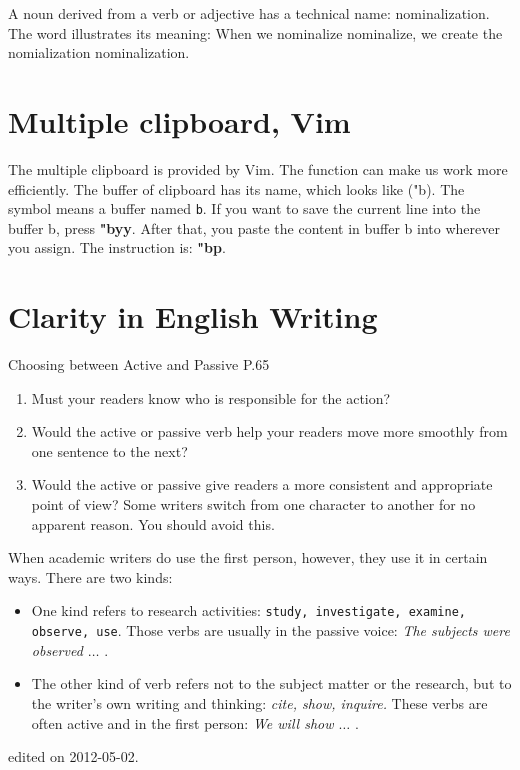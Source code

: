 A noun derived from a verb or adjective has a technical name: nominalization. The word illustrates its meaning: When we nominalize nominalize, we create the nomialization nominalization.

\section{Multiple clipboard, Vim}
The multiple clipboard is provided by Vim. The function can make us work more efficiently.  The buffer of clipboard has its name, which looks like ("b). The symbol means a buffer named \texttt{b}. If you want to save the current line into the buffer b, press {\bf "byy}. After that, you paste the content in buffer b into wherever you assign. The instruction is: {\bf"bp}. 

\section{Clarity in English Writing}
Choosing between Active and Passive P.65
\begin{enumerate}
\item Must your readers know who is responsible for the action?
\item Would the active or passive verb help your readers move more smoothly from one sentence to the next?
\item Would the active or passive give readers a more consistent and appropriate point of view?
Some writers switch from one character to another for no apparent reason. You should avoid this.
\end{enumerate}

When academic writers do use the first person, however, they use it in certain ways. There are two kinds:
\begin{itemize}
\item One kind refers to research activities: \texttt{study, investigate, examine, observe, use}. Those verbs are usually in the passive voice: 
\emph{ The subjects were observed $\ldots$} .
\item The other kind of verb refers not to the subject matter or the research, but to the writer's own writing and thinking: \emph{cite, show, inquire.}
These verbs are often active and in the first person: \emph{We will show $\ldots$ }. 
\end{itemize}
\hfill {\tiny  edited on 2012-05-02.}

